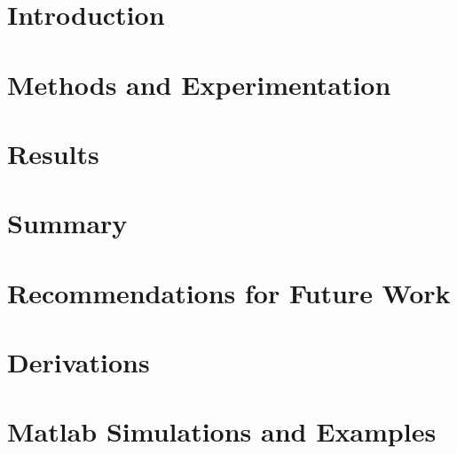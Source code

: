 \documentclass[12pt,american]{report}
\begin{document}
\renewcommand\thepage{}

\newpage
\mbox{}
\newpage

\renewcommand\thepage{\arabic{page}}
\setcounter{page}{2}

\doublespacing%



\singlespacing%
\tableofcontents             %
\listoffigures               %



\cleardoublepage%


\doublespacing%

\chapter{Introduction}

\chapter{Methods and Experimentation}



\chapter{Results}

\chapter{Summary}

\chapter{Recommendations for Future Work}


\appendix
\chapter{Derivations}

\chapter{Matlab Simulations and Examples}





\end{document}
